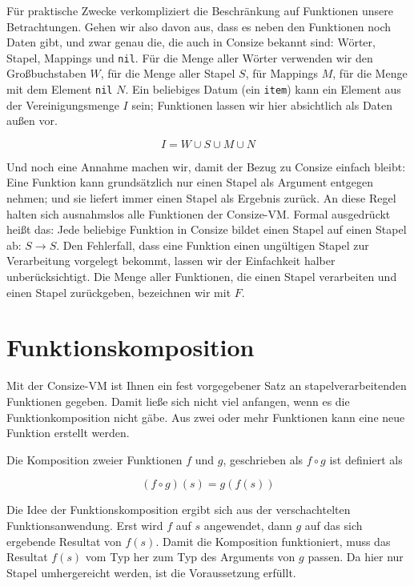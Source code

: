 Für praktische Zwecke verkompliziert die Beschränkung auf Funktionen unsere Betrachtungen. Gehen wir also davon aus, dass es neben den Funktionen noch Daten gibt, und zwar genau die, die auch in Consize bekannt sind: Wörter, Stapel, Mappings und \verb|nil|. Für die Menge aller Wörter verwenden wir den Großbuchstaben $W$, für die Menge aller Stapel $S$, für Mappings $M$, für die Menge mit dem Element \verb|nil| $N$. Ein beliebiges Datum (ein \verb|item|) kann ein Element aus der Vereinigungsmenge $I$ sein; Funktionen lassen wir hier absichtlich als Daten außen vor.

\begin{equation}
I = W\cup S \cup M \cup N
\end{equation}

Und noch eine Annahme machen wir, damit der Bezug zu Consize einfach bleibt: Eine Funktion kann grundsätzlich nur einen Stapel als Argument entgegen nehmen; und sie liefert immer einen Stapel als Ergebnis zurück. An diese Regel halten sich ausnahmslos alle Funktionen der Consize-VM. Formal ausgedrückt heißt das: Jede beliebige Funktion in Consize bildet einen Stapel auf einen Stapel ab: $S\rightarrow S$. Den Fehlerfall, dass eine Funktion einen ungültigen Stapel zur Verarbeitung vorgelegt bekommt, lassen wir der Einfachkeit halber unberücksichtigt. Die Menge aller Funktionen, die einen Stapel verarbeiten und einen Stapel zurückgeben, bezeichnen wir mit $F$.

\section{Funktionskomposition}

Mit der Consize-VM ist Ihnen ein fest vorgegebener Satz an stapelverarbeitenden Funktionen gegeben. Damit ließe sich nicht viel anfangen, wenn es die Funktionkomposition nicht gäbe. Aus zwei oder mehr Funktionen kann eine neue Funktion erstellt werden.

Die Komposition zweier Funktionen $f$ und $g$, geschrieben als $f\circ g$ ist definiert als

\begin{equation}
(f\circ g)(s) = g(f(s))
\end{equation}

Die Idee der Funktionskomposition ergibt sich aus der verschachtelten Funktionsanwendung. Erst wird $f$ auf $s$ angewendet, dann $g$ auf das sich ergebende Resultat von $f(s)$. Damit die Komposition funktioniert, muss das Resultat $f(s)$ vom Typ her zum Typ des Arguments von $g$ passen. Da hier nur Stapel umhergereicht werden, ist die Voraussetzung erfüllt.

